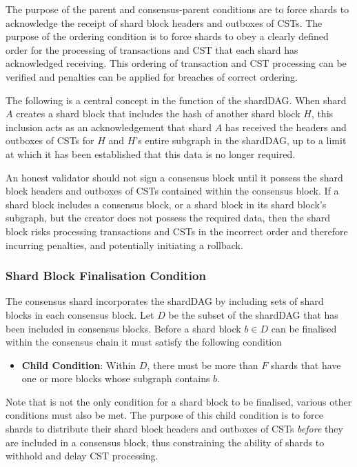 The purpose of the parent and consensus-parent conditions are to force shards to acknowledge the receipt of shard block headers and outboxes of CSTs.
The purpose of the ordering condition is to force shards to obey a clearly defined order for the processing of transactions and CST that each shard has acknowledged receiving. 
This ordering of transaction and CST processing can be verified and penalties can be applied for breaches of correct ordering.

The following is a central concept in the function of the shardDAG.
When shard $A$ creates a shard block that includes the hash of another shard block $H$, this inclusion acts as an acknowledgement that shard $A$ has received the headers and outboxes of CSTs for $H$ and $H$’s entire subgraph in the shardDAG, up to a limit at which it has been established that this data is no longer required.

An honest validator should not sign a consensus block until it possess the shard block headers and outboxes of CSTs contained within the consensus block.
If a shard block includes a consensus block, or a shard block in its shard block's subgraph, but the creator does not possess the required data, then the shard block risks processing transactions and CSTs in the incorrect order and therefore incurring penalties, and potentially initiating a rollback.


\subsubsection{Shard Block Finalisation Condition}
\label{section:shard-block-finalisation}
The consensus shard incorporates the shardDAG by including sets of shard blocks in each consensus block. 
Let $D$ be the subset of the shardDAG that has been included in consensus blocks. Before a shard block $b\in D$ can be finalised within the consensus chain it must satisfy the following condition
\begin{itemize}
	\item \textbf{Child Condition}: Within $D$, there must be more than $F$ shards that have one or more blocks whose subgraph contains $b$.
\end{itemize}
Note that is not the only condition for a shard block to be finalised, various other conditions must also be met.
The purpose of this child condition is to force shards to distribute their shard block headers and outboxes of CSTs {\it before} they are included in a consensus block, thus constraining the ability of shards to withhold and delay CST processing.



